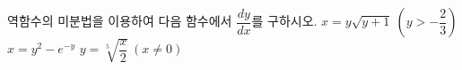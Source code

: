 역함수의 미분법을 이용하여 다음 함수에서 $\dfrac{dy}{dx}$를 구하시오.
 $x=y\sqrt{y+1}\ \left(y>-\dfrac{2}{3}\right)$
 $x=y^2-e^{-y}$
 $y=\sqrt[5]{\dfrac{x}{2}}\ (x\ne 0)$
